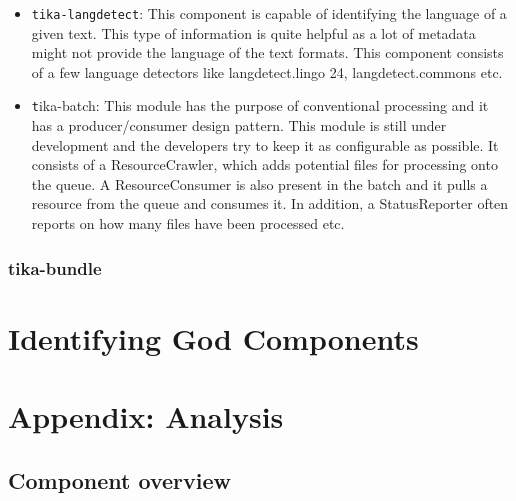 \documentclass{article}
\begin{document}
\begin{itemize}
    \item\texttt{tika-langdetect}: This component is capable of identifying the language of a given text. This type of information is quite helpful as a lot of metadata might not provide the language of the text formats. This component consists of a few language detectors like langdetect.lingo 24, langdetect.commons etc. 
    \item\texttt tika-batch: This module has the purpose of conventional processing and it has a producer/consumer design pattern. This module is still under development and the developers try to keep it as configurable as possible. It consists of a ResourceCrawler, which adds potential files for processing onto the queue. A ResourceConsumer is also present in the batch and it pulls a resource from the queue and consumes it. In addition, a StatusReporter often reports on how many files have been processed etc.
    \end{itemize}

\subsubsection{tika-bundle} %



\section{Identifying God Components}




\appendix
\section{Appendix: Analysis}
\subsection{Component overview}
\end{document}
